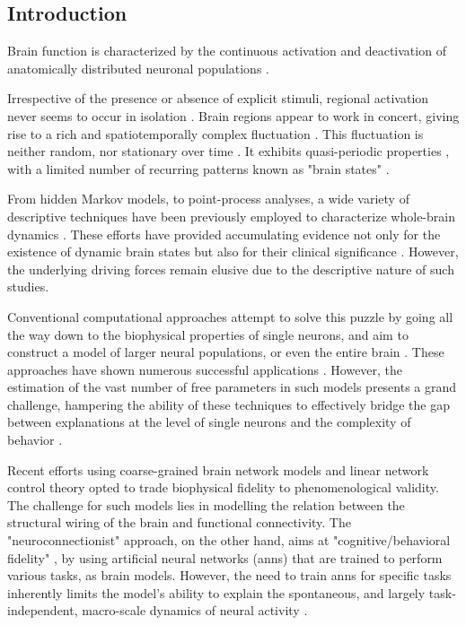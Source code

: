 \documentclass{article}
\begin{document}
\subsection{Introduction}

Brain function is characterized by the continuous activation and deactivation of anatomically distributed neuronal
populations \citep{buzsaki2006rhythms}.

Irrespective of the presence or absence of explicit stimuli, regional activation never seems to occur in isolation
\citep{bassett2017network}. Brain regions appear to work in concert, giving rise to a
rich and spatiotemporally complex fluctuation \citep{gutierrez2019infraslow}.
This fluctuation is neither random, nor stationary over time \citep{liu2013time, zalesky2014time}.
It exhibits quasi-periodic properties \citep{thompson2014quasi}, with a limited number of
recurring patterns known as "brain states" \citep{greene2023everyone, vidaurre2017brain, liu2013time, richiardi2011decoding}.

From hidden Markov models, to point-process analyses, a wide variety of descriptive techniques have been previously
employed to characterize whole-brain dynamics \citep{smith2012temporally, vidaurre2017brain, liu2013time, chen2018human}.
These efforts have provided accumulating evidence not only for the existence of dynamic brain states but also for their clinical
significance \citep{hutchison2013dynamic, barttfeld2015signature, meer2020movie}.
However, the underlying driving forces remain elusive due to the descriptive nature of such studies.

Conventional computational approaches attempt to solve this puzzle by going all the way down to the biophysical properties of single neurons, and aim to construct a model of larger neural populations, or even the entire brain
\citep{breakspear2017dynamic}.
These approaches have shown numerous successful applications \citep{murray2018biophysical, kriegeskorte2018cognitive, heinz2019towards}.
However, the estimation of the vast number of free parameters in such models presents a grand challenge, hampering the ability of these techniques to effectively bridge the gap between explanations at the level of single neurons and the complexity of behavior \citep{breakspear2017dynamic}.

Recent efforts using coarse-grained brain network models \citep{schirner2022dynamic, schiff1994controlling, papadopoulos2017development} and linear network control theory  \citep{luppi2023transitions, chiem2021structure, gu2017optimal, scheid2021time, gu2015controllability} opted to trade biophysical fidelity to phenomenological validity. The challenge for such models lies in modelling the relation between the structural wiring of the brain and functional connectivity.
The "neuroconnectionist" approach, on the other hand, \citep{doerig2023neuroconnectionist} aims at "cognitive/behavioral fidelity" \citep{kriegeskorte2018cognitive}, by using artificial neural networks (\acrshort{ann}s) that are trained to perform various tasks, as brain models. However, the need to train \acrshort{ann}s for specific tasks inherently limits the model's ability to explain the spontaneous, and largely task-independent, macro-scale dynamics of neural activity \citep{richards2019deep}.
\end{document}
